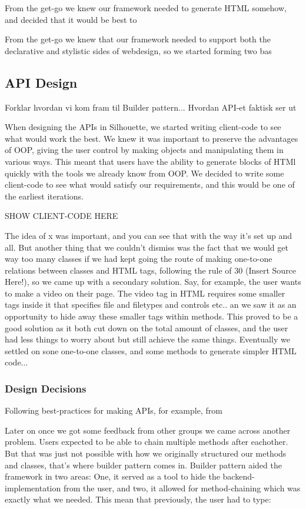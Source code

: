 \documentclass[12pt]{article}
\begin{document}
    From the get-go we knew our framework needed to generate HTML somehow, and decided that it would be best to 

    From the get-go we knew that our framework needed to support both the declarative and stylistic sides of webdesign, so we started forming two bas
    

    \subsection{API Design}
    Forklar hvordan vi kom fram til Builder pattern... Hvordan API-et faktisk ser ut

    When designing the APIs in Silhouette, we started writing client-code to see what would work the best. We knew it was important to preserve the advantages of OOP, giving the user control by making objects and manipulating them in various ways. This meant that users have the ability to generate blocks of HTMl quickly with the tools we already know from OOP. We decided to write some client-code to see what would satisfy our requirements, and this would be one of the earliest iterations.

    SHOW CLIENT-CODE HERE
    
    The idea of x was important, and you can see that with the way it's set up and all. But another thing that we couldn't dismiss was the fact that we would get way too many classes if we had kept going the route of making one-to-one relations between classes and HTML tags, following the rule of 30 (Insert Source Here!), so we came up with a secondary solution. Say, for example, the user wants to make a video on their page. The video tag in HTML requires some smaller tags inside it that specifies file and filetypes and controls etc.. an we saw it as an opportunity to hide away these smaller tags within methods. This proved to be a good solution as it both cut down on the total amount of classes, and the user had less things to worry about but still achieve the same things. Eventually we settled on sone one-to-one classes, and some methods to generate simpler HTML code...
    
        \subsubsection{Design Decisions}
        Following best-practices for making APIs, for example, from     

        Later on once we got some feedback from other groups we came across another problem. Users expected to be able to chain multiple methods after eachother. But that was just not possible with how we originally structured our methods and classes, that's where builder pattern comes in. Builder pattern aided the framework in two areas: One, it served as a tool to hide the backend-implementation from the user, and two, it allowed for method-chaining which was exactly what we needed. This mean that previously, the user had to type:
\end{document}
